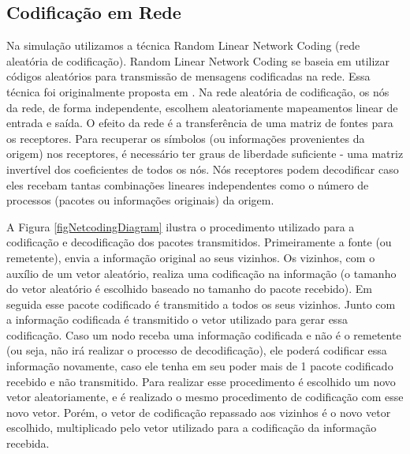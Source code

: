 \subsection{Codificação em Rede}\label{sec:codeRede}

Na simulação utilizamos a técnica Random Linear Network Coding (rede
aleatória de codificação). Random Linear Network Coding se baseia em
utilizar códigos aleatórios para transmissão de mensagens codificadas na
rede. Essa técnica foi originalmente proposta em \cite{Ho03thebenefits}.
Na rede aleatória de codificação, os nós da rede, de forma independente,
escolhem aleatoriamente mapeamentos linear de entrada e saída. O efeito
da rede é a transferência de uma matriz de fontes para os receptores.
Para recuperar os símbolos (ou informações provenientes da origem) nos
receptores, é necessário ter graus de liberdade suficiente - uma matriz
invertível dos coeficientes de todos os nós. Nós receptores podem
decodificar caso eles recebam tantas combinações lineares independentes
como o número de processos (pacotes ou informações originais) da origem.

A Figura \ref{figNetcodingDiagram} ilustra o procedimento utilizado para
a codificação e decodificação dos pacotes transmitidos. Primeiramente a
fonte (ou remetente), envia a informação original ao seus vizinhos. Os
vizinhos, com o auxílio de um vetor aleatório, realiza uma codificação
na informação (o tamanho do vetor aleatório é escolhido baseado no
tamanho do pacote recebido). Em seguida esse pacote codificado é
transmitido a todos os seus vizinhos. Junto com a informação codificada
é transmitido o vetor utilizado para gerar essa codificação. Caso um
nodo receba uma informação codificada e não é o remetente (ou seja, não
irá realizar o processo de decodificação), ele poderá codificar essa
informação novamente, caso ele tenha em seu poder mais de 1 pacote
codificado recebido e não transmitido. Para realizar esse procedimento é
escolhido um novo vetor aleatoriamente, e é realizado o mesmo
procedimento de codificação com esse novo vetor. Porém, o vetor de
codificação repassado aos vizinhos é o novo vetor escolhido,
multiplicado pelo vetor utilizado para a codificação da informação
recebida.


